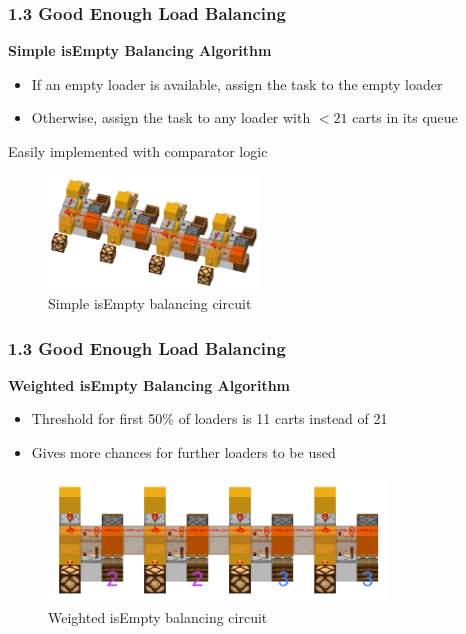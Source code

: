 \documentclass[aspectratio=169]{beamer}
\begin{document}
\begin{frame}
    \frametitle{1.3 Good Enough Load Balancing}

    \textbf{Simple isEmpty Balancing Algorithm}

    \begin{itemize}
        \item If an empty loader is available, assign the task to the empty loader
        \item Otherwise, assign the task to any loader with $< 21$ carts in its queue
    \end{itemize}

    Easily implemented with comparator logic
    \begin{figure}
        \centering
        \includegraphics[width=0.5\textwidth]{simple.png}
		\caption{Simple isEmpty balancing circuit}
	\end{figure}
  

\end{frame}

\begin{frame}
    \frametitle{1.3 Good Enough Load Balancing}

    \textbf{Weighted isEmpty Balancing Algorithm}

    \begin{itemize}
        \item Threshold for first 50\% of loaders is 11 carts instead of 21
        \item Gives more chances for further loaders to be used
    \end{itemize}

    \begin{figure}
        \centering
        \includegraphics[width=0.8\textwidth]{weighted.png}
		\caption{Weighted isEmpty balancing circuit}
	\end{figure}

\end{frame}
\end{document}
